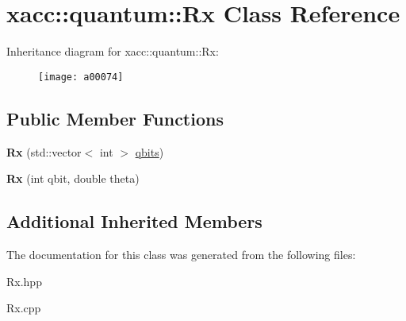 \hypertarget{a00074}{}\section{xacc\+:\+:quantum\+:\+:Rx Class Reference}
\label{a00074}
Inheritance diagram for xacc\+:\+:quantum\+:\+:Rx\+:\begin{figure}[H]
\begin{center}
\leavevmode
\texttt{[image: a00074]}
\end{center}
\end{figure}
\subsection*{Public Member Functions}
\begin{DoxyCompactItemize}
\item 
{\bfseries Rx} (std\+::vector$<$ int $>$ \hyperlink{a00042_a2a56be6c2519ea65df4d06f4abae1393}{qbits})\hypertarget{a00074_a03babfe938a6cbf7f744fcd31a52d92d}{}\label{a00074_a03babfe938a6cbf7f744fcd31a52d92d}

\item 
{\bfseries Rx} (int qbit, double theta)\hypertarget{a00074_a01667b11d34d5621b98ebff9a07d9bbf}{}\label{a00074_a01667b11d34d5621b98ebff9a07d9bbf}

\end{DoxyCompactItemize}
\subsection*{Additional Inherited Members}


The documentation for this class was generated from the following files\+:\begin{DoxyCompactItemize}
\item 
Rx.\+hpp\item 
Rx.\+cpp\end{DoxyCompactItemize}
